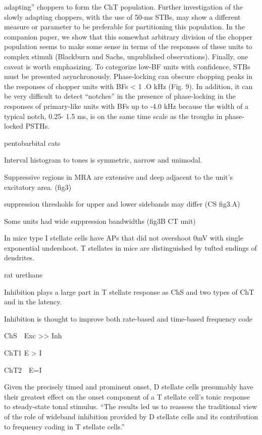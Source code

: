 \documentclass[10pt,a4paper]{article}
\begin{document}
adapting{\textquotedblright} choppers to form the ChT population.  Further
investigation of the slowly adapting choppers, with the use of 50-ms STBs, may
show a different measure or parameter to be preferable for partitioning this
population. In the companion paper, we show that this somewhat arbitrary
division of the chopper population seems to make some sense in terms of the
responses of these units to complex stimuli (Blackburn and Sachs, unpublished
observations). Finally, one caveat is worth emphasizing. To categorize low-BF
units with confidence, STBs must be presented asynchronously. Phase-locking can
obscure chopping peaks in the responses of chopper units with BFs {\textless} 1
.O kHz (Fig. 9). In addition, it can be very difficult to detect
{\textquotedblleft}notches{\textquotedblright} in the presence of phase-locking
in the responses of primary-like units with BFs up to -4.0 kHz because the width
of a typical notch, 0.25- 1.5 ms, is on the same time scale as the troughs in
phase-locked PSTHs.


\citep{RhodeGreenberg:1994b} pentobarbital cats

Interval histogram to tones is symmetric, narrow and unimodal.

Suppressive regions in MRA are extensive and deep adjacent to the
unit{\textquoteright}s excitatory area. (fig3)

suppression thresholds for upper and lower sidebands may differ (CS fig3.A)

Some units had wide suppression bandwidths (fig3B CT unit)

In mice \citep{OertelWuEtAl:1990} type I stellate cells have APs that did not
overshoot 0mV with single exponential undershoot.  T stellates in mice are
distinguished by tufted endings of dendrites.



\citep{PaoliniClareyEtAl:2005,PaoliniClareyEtAl:2004} rat urethane

Inhibition plays a large part in T stellate response as ChS and two types of ChT
and in the latency.

Inhibition is thought to improve both rate-based and time-based frequency code

ChS\ \ Exc {\textgreater}{\textgreater} Inh

ChT1 E {\textgreater} I\ \

ChT2\ \ E=I

Given the precisely timed and prominent onset, D stellate cells presumably have
their greatest effect on the onset component of a T stellate
cell{\textquoteright}s tonic response to steady-state tonal stimulus.
{\textquotedblleft}The results led us to reassess the traditional view of the
role of wideband inhibition provided by D stellate cells and its contribution to
frequency coding in T stellate cells.{\textquotedblright}
\end{document}
